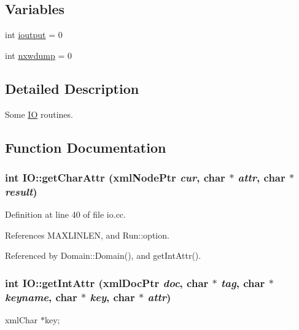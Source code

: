 \subsection*{Variables}
\begin{CompactItemize}
\item 
int \hyperlink{namespaceIO_01c166ef9176fbdc6b1f96de7ca861a4}{ioutput} = 0
\item 
int \hyperlink{namespaceIO_ab2504f45fec1bcec679af841fa5065c}{nxwdump} = 0
\end{CompactItemize}


\subsection{Detailed Description}
Some \hyperlink{namespaceIO}{IO} routines. 



\subsection{Function Documentation}
\hypertarget{namespaceIO_26ddf14f09f4920f5578ffbf80e37cb5}{
\subsubsection[{getCharAttr}]{\setlength{\rightskip}{0pt plus 5cm}int IO::getCharAttr (xmlNodePtr {\em cur}, \/  char $\ast$ {\em attr}, \/  char $\ast$ {\em result})}}
\label{namespaceIO_26ddf14f09f4920f5578ffbf80e37cb5}




Definition at line 40 of file io.cc.

References MAXLINLEN, and Run::option.

Referenced by Domain::Domain(), and getIntAttr().\hypertarget{namespaceIO_cede0d1cb29c928037684467fda0b02a}{
\subsubsection[{getIntAttr}]{\setlength{\rightskip}{0pt plus 5cm}int IO::getIntAttr (xmlDocPtr {\em doc}, \/  char $\ast$ {\em tag}, \/  char $\ast$ {\em keyname}, \/  char $\ast$ {\em key}, \/  char $\ast$ {\em attr})}}
\label{namespaceIO_cede0d1cb29c928037684467fda0b02a}




xmlChar $\ast$key;

